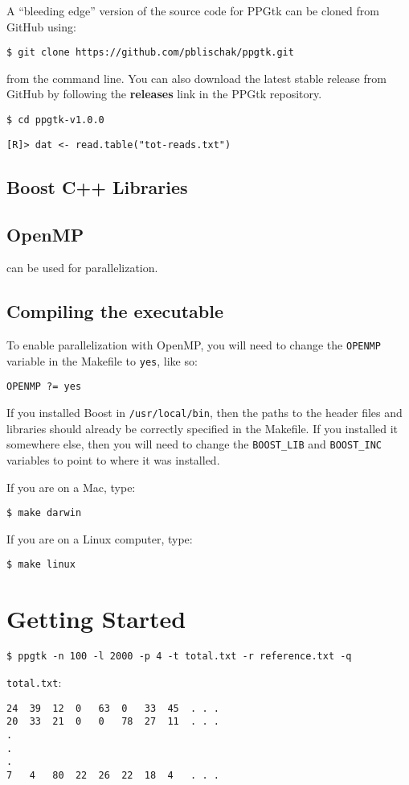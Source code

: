 \documentclass[11pt,english,letterpaper,oneside]{article}
\newcommand{\ppgtk}{PPGtk}
\newcommand{\code}[1]{\hspace{15pt} \texttt{#1}}
\begin{document}
A ``bleeding edge'' version of the source code for \ppgtk{} can be cloned from GitHub using:

\code{\$ git clone https://github.com/pblischak/ppgtk.git}

from the command line. You can also download the latest stable release from GitHub by following the \textbf{releases} link in the \ppgtk{} repository.

\code{\$ cd ppgtk-v1.0.0}

\code{[R]> dat <- read.table("tot-reads.txt")}

\subsection{Boost C++ Libraries}


\subsection{OpenMP}

can be used for parallelization.

\subsection{Compiling the executable}

To enable parallelization with OpenMP, you will need to change the \texttt{OPENMP} variable in the Makefile to \texttt{yes}, like so:

\code{OPENMP ?= yes}

If you installed Boost in \texttt{/usr/local/bin}, then the paths to the header files and libraries should already be correctly specified in the Makefile. If you installed it somewhere else, then you will need to change the \texttt{BOOST\_LIB} and \texttt{BOOST\_INC} variables to point to where it was installed.

If you are on a Mac, type:

\code{\$ make darwin}

If you are on a Linux computer, type:

\code{\$ make linux}

\section{Getting Started}

\code{\$ ppgtk -n 100 -l 2000 -p 4 -t total.txt -r reference.txt -q}

\texttt{total.txt}:

\begin{verbatim}
24	39	12	0	63	0	33	45	. . .
20	33	21	0	0	78	27	11	. . .
.
.
.
7	4	80	22	26	22	18	4	. . .
\end{verbatim}

\newpage

%
%
\end{document}
